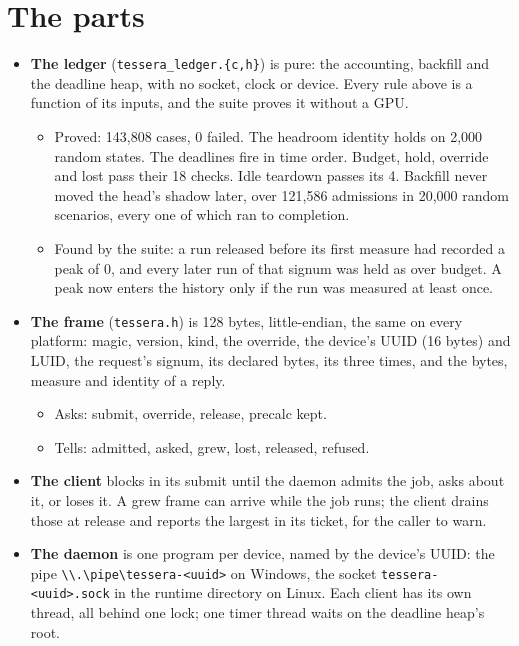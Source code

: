 \section{\texorpdfstring{The parts}{The parts}}

\begin{itemize}
\item \textbf{The ledger} (\texttt{tessera\_\allowbreak{}ledger.\allowbreak{}\{c,h\}}) is pure: the accounting, backfill and the deadline heap, with no socket, clock or device. Every rule above is a function of its inputs, and the suite proves it without a GPU.

\begin{itemize}
\item Proved: 143,808 cases, 0 failed. The headroom identity holds on 2,000 random states. The deadlines fire in time order. Budget, hold, override and lost pass their 18 checks. Idle teardown passes its 4. Backfill never moved the head's shadow later, over 121,586 admissions in 20,000 random scenarios, every one of which ran to completion.
\item Found by the suite: a run released before its first measure had recorded a peak of 0, and every later run of that signum was held as over budget. A peak now enters the history only if the run was measured at least once.
\end{itemize}
\item \textbf{The frame} (\texttt{tessera.\allowbreak{}h}) is 128 bytes, little-endian, the same on every platform: magic, version, kind, the override, the device's UUID (16 bytes) and LUID, the request's signum, its declared bytes, its three times, and the bytes, measure and identity of a reply.

\begin{itemize}
\item Asks: submit, override, release, precalc kept.
\item Tells: admitted, asked, grew, lost, released, refused.
\end{itemize}
\item \textbf{The client} blocks in its submit until the daemon admits the job, asks about it, or loses it. A grew frame can arrive while the job runs; the client drains those at release and reports the largest in its ticket, for the caller to warn.
\item \textbf{The daemon} is one program per device, named by the device's UUID: the pipe \texttt{\textbackslash{}\textbackslash{}.\allowbreak{}\textbackslash{}pipe\textbackslash{}tessera-\allowbreak{}<uuid>} on Windows, the socket \texttt{tessera-\allowbreak{}<uuid>.\allowbreak{}sock} in the runtime directory on Linux. Each client has its own thread, all behind one lock; one timer thread waits on the deadline heap's root.


\end{itemize}
